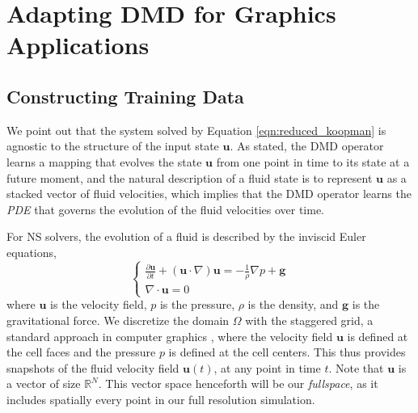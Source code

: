 \section{Adapting DMD for Graphics Applications}
\label{sec:methodology}


\subsection{Constructing Training Data}
We point out that the system solved by Equation \ref{eqn:reduced_koopman} is agnostic to the structure of the input state $\bm{u}$. As stated, the DMD operator learns a mapping that evolves the state $\bm{u}$ from one point in time to its state at a future moment, and the natural description of a fluid state is to represent $\bm{u}$ as a stacked vector of fluid velocities, which implies that the DMD operator learns the \emph{PDE} that governs the evolution of the fluid velocities over time.

For NS solvers, the evolution of a fluid is described by the inviscid Euler equations,
\begin{equation}
    \label{eqn:euler_equations}
    \begin{cases}
        \frac{\partial \bm{u}}{\partial t} + (\bm{u} \cdot \nabla) \bm{u} = -\frac{1}{\rho} \nabla p + \bm{g} \\
        \nabla \cdot \bm{u} = 0
    \end{cases}
\end{equation}
where $\bm{u}$ is the velocity field, $p$ is the pressure, $\rho$ is the density, and $\bm{g}$ is the gravitational force. We discretize the domain $\Omega$ with the staggered grid, a standard approach in computer graphics \cite{harlow1965numerical}, where the velocity field $\bm u$ is defined at the cell faces and the pressure $p$ is defined at the cell centers. This thus provides snapshots of the fluid velocity field $\bm{u}(t)$, at any point in time $t$. Note that $\bm{u}$ is a vector of size $\mathbb{R}^{N}$. This vector space henceforth will be our \emph{fullspace}, as it includes spatially every point in our full resolution simulation.

